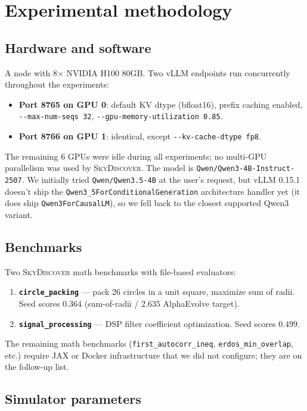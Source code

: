 \documentclass[11pt]{article}
\newcommand{\skyd}{\textsc{SkyDiscover}}
\begin{document}
\section{Experimental methodology}
\label{sec:methodology}

\subsection{Hardware and software}

A node with 8$\times$ NVIDIA H100 80GB. Two vLLM endpoints run
concurrently throughout the experiments:
\begin{itemize}
  \item \textbf{Port 8765 on GPU 0}: default KV dtype (bfloat16),
    prefix caching enabled, \verb|--max-num-seqs 32|,
    \verb|--gpu-memory-utilization 0.85|.
  \item \textbf{Port 8766 on GPU 1}: identical, except
    \verb|--kv-cache-dtype fp8|.
\end{itemize}
The remaining 6 GPUs were idle during all experiments; no multi-GPU
parallelism was used by \skyd{}. The model is
\verb|Qwen/Qwen3-4B-Instruct-2507|. We initially tried
\verb|Qwen/Qwen3.5-4B| at the user's request, but vLLM 0.15.1 doesn't
ship the \verb|Qwen3_5ForConditionalGeneration| architecture handler
yet (it does ship \verb|Qwen3ForCausalLM|), so we fell back to the
closest supported Qwen3 variant.

\subsection{Benchmarks}

Two \skyd{} math benchmarks with file-based evaluators:
\begin{enumerate}
  \item \textbf{\texttt{circle\_packing}} --- pack 26 circles in a
    unit square, maximize sum of radii. Seed scores $0.364$
    (sum-of-radii / $2.635$ AlphaEvolve target).
  \item \textbf{\texttt{signal\_processing}} --- DSP filter
    coefficient optimization. Seed scores $0.499$.
\end{enumerate}
The remaining math benchmarks (\texttt{first\_autocorr\_ineq},
\texttt{erdos\_min\_overlap}, etc.) require JAX or Docker
infrastructure that we did not configure; they are on the
follow-up list.

\subsection{Simulator parameters}
\end{document}
